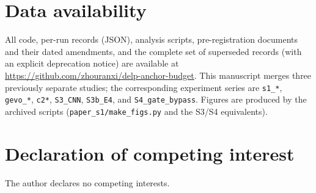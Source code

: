 \documentclass[review,12pt,number]{elsarticle}
\begin{document}
\section*{Data availability}
All code, per-run records (JSON), analysis scripts, pre-registration documents
and their dated amendments, and the complete set of superseded records (with
an explicit deprecation notice) are available at
\url{https://github.com/zhouranxi/delp-anchor-budget}. This manuscript merges
three previously separate studies; the corresponding experiment series are
\texttt{s1\_*}, \texttt{gevo\_*}, \texttt{c2*}, \texttt{S3\_CNN},
\texttt{S3b\_E4}, and \texttt{S4\_gate\_bypass}. Figures are produced by the
archived scripts (\texttt{paper\_s1/make\_figs.py} and the S3/S4 equivalents).

\section*{Declaration of competing interest}
The author declares no competing interests.



\end{document}
